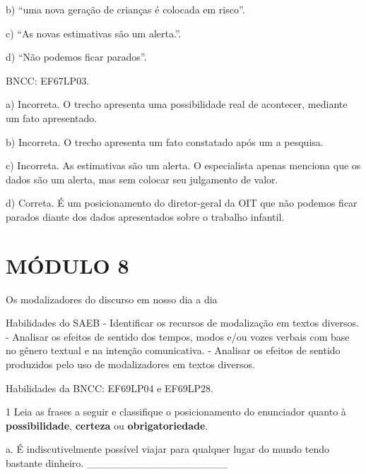 {b) ``uma nova geração de crianças é colocada em risco''.

c) ``As novas estimativas são um alerta.''.

d) ``Não podemos ficar parados''.

BNCC: EF67LP03.

a) Incorreta. O trecho apresenta uma possibilidade real de acontecer,
mediante um fato apresentado.

b) Incorreta. O trecho apresenta um fato constatado após um a pesquisa.

c) Incorreta. As estimativas são um alerta. O especialista apenas
menciona que os dados são um alerta, mas sem colocar seu julgamento de
valor.

d) Correta. É um posicionamento do diretor-geral da OIT que não podemos
ficar parados diante dos dados apresentados sobre o trabalho infantil.

\section{MÓDULO 8}

Os modalizadores do discurso em nosso dia a dia

Habilidades do SAEB - Identificar os recursos de modalização em textos
diversos. - Analisar os efeitos de sentido dos tempos, modos e/ou vozes
verbais com base no gênero textual e na intenção comunicativa. -
Analisar os efeitos de sentido produzidos pelo uso de modalizadores em
textos diversos.

Habilidades da BNCC: EF69LP04 e EF69LP28.


\num{1} Leia as frases a seguir e classifique o posicionamento do
enunciador quanto à \textbf{possibilidade}, \textbf{certeza} ou
\textbf{obrigatoriedade}.

a. É indiscutivelmente possível viajar para qualquer lugar do mundo
tendo bastante dinheiro. \_\_\_\_\_\_\_\_\_\_\_\_\_\_\_\_\_\_\_

}
